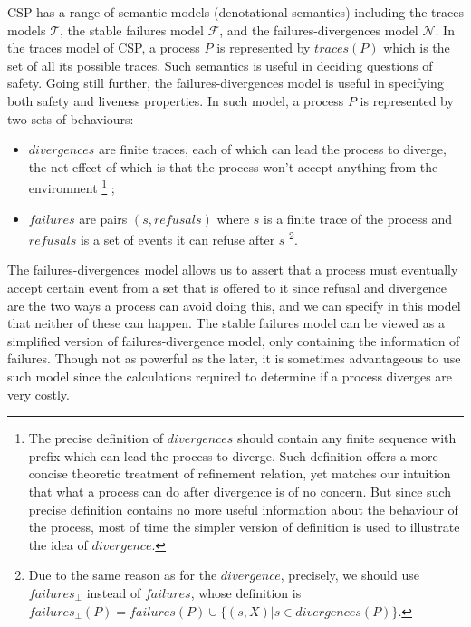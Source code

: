 \documentclass{llncs}
\newcommand{\csptracesmodel}{\mathcal{T}}
\newcommand{\cspfdrmodel}{\mathcal{N}}
\newcommand{\cspfailuresmodel}{\mathcal{F}}
\begin{document}
CSP has a range of semantic models (denotational semantics) including the traces models
$\csptracesmodel$, the stable failures model $\cspfailuresmodel$, and the
failures-divergences model $\cspfdrmodel$. In the traces model of CSP, a process
$P$ is represented by $traces(P)$ which is the set of all its possible traces. 
Such semantics is useful in deciding questions of safety. Going still further, the 
failures-divergences model is useful in specifying both safety and liveness
properties. In such model, a process $P$ is represented by two sets of
behaviours:
\begin{itemize}

\item $divergences$ are finite traces, each of which can lead the process to
diverge, the net effect of which is that the process won't accept anything
from the environment
\footnote{The precise definition of $divergences$ should contain any finite
sequence with prefix which can lead the process to diverge.
Such definition offers a more concise theoretic treatment of refinement
relation, yet matches our intuition that what a process can do after divergence
is of no concern. But since such precise definition contains no more useful
information about the behaviour of the process, most of time the simpler version
of definition is used to illustrate the idea of $divergence$.
}
;

\item $failures$ are pairs $(s, refusals)$ where $s$ is a finite trace of the
process and $refusals$ is a set of events it can refuse after $s$
\footnote{Due to the same reason as for the $divergence$,
precisely, we should use $failures_{\bot}$ instead of $failures$, whose definition
is $failures_{\bot}(P) = failures(P) \cup \{(s, X)| s \in divergences(P)\}$. 
}.
\end{itemize}
The failures-divergences model allows us to assert that a process must eventually accept
certain event from a set that is offered to it since refusal and divergence are the
two ways a process can avoid doing this, and we can specify in this model that
neither of these can happen. The stable failures model can be viewed as a simplified version of
failures-divergence model, only containing the information of failures. Though
not as powerful as the later, it is sometimes advantageous to use such model
since the calculations required to determine if a process diverges are very
costly.
\end{document}
